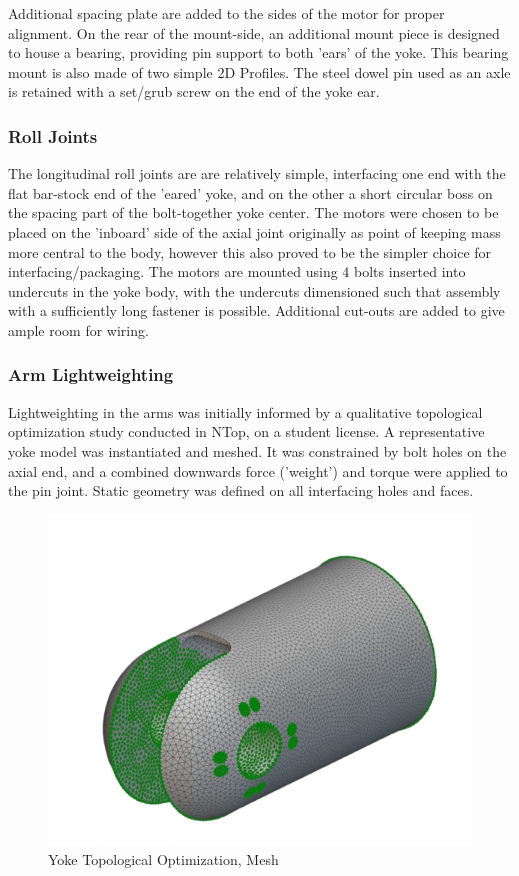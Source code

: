 \documentclass{article}
\begin{document}
Additional spacing plate are added to the sides of the motor for proper alignment. On the rear of the mount-side, an additional mount piece is designed to house a bearing, providing pin support to both 'ears' of the yoke. This bearing mount is also made of two simple 2D Profiles. The steel dowel pin used as an axle is retained with a set/grub screw on the end of the yoke ear.

\subsubsection{Roll Joints}

The longitudinal roll joints are are relatively simple, interfacing one end with the flat bar-stock end of the 'eared' yoke, and on the other a short circular boss on the spacing part of the bolt-together yoke center. The motors were chosen to be placed on the 'inboard' side of the axial joint originally as point of keeping mass more central to the body, however this also proved to be the simpler choice for interfacing/packaging. The motors are mounted using 4 bolts inserted into undercuts in the yoke body, with the undercuts dimensioned such that assembly with a sufficiently long fastener is possible. Additional cut-outs are added to give ample room for wiring.

\subsubsection{Arm Lightweighting}

Lightweighting in the arms was initially informed by a qualitative topological optimization study conducted in NTop, on a student license. A representative yoke model was instantiated and meshed. It was constrained by bolt holes on the axial end, and a combined downwards force ('weight') and torque were applied to the pin joint. Static geometry was defined on all interfacing holes and faces. 

\begin{figure}
    \centering
    \includegraphics[width=0.5\linewidth]{assets/MOHRA/Sub-Arm/Ntop_Mesh_tp.png}
    \caption{Yoke Topological Optimization, Mesh}
    \label{fig:enter-label}
\end{figure}
\end{document}
